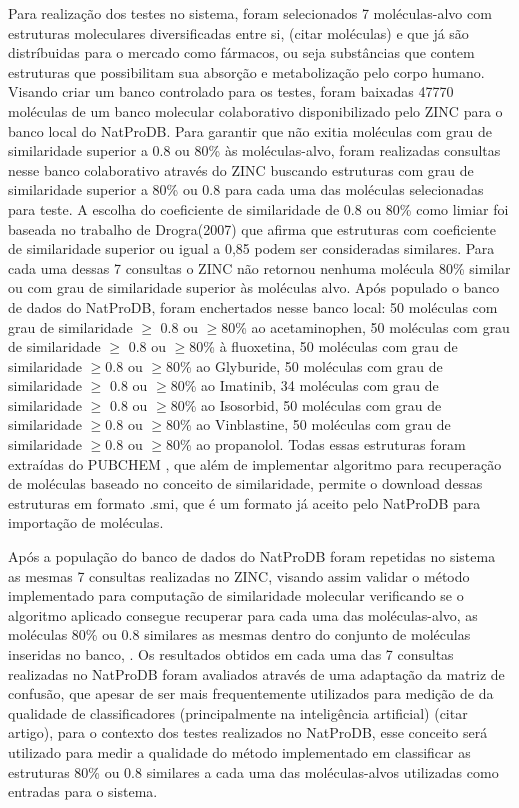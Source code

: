 Para realização dos testes no sistema, foram selecionados 7 moléculas-alvo  com estruturas moleculares diversificadas entre si, (citar moléculas) e que já são distríbuidas para o mercado como fármacos, ou seja substâncias que contem estruturas que possibilitam sua absorção e metabolização pelo corpo humano. Visando criar um banco controlado para os testes, foram baixadas 47770 moléculas de um banco molecular colaborativo disponibilizado pelo ZINC \cite{irwin2005zinc} para o banco local do NatProDB. Para garantir que não exitia moléculas com grau de similaridade superior a 0.8 ou 80\% às moléculas-alvo, foram realizadas consultas nesse banco colaborativo através do ZINC buscando estruturas com grau de similaridade superior a 80\% ou 0.8 para cada uma das moléculas selecionadas para teste. A escolha do coeficiente de similaridade de 0.8 ou 80\% como limiar foi baseada no trabalho de Drogra(2007) que afirma que estruturas com coeficiente de similaridade superior ou igual a 0,85 podem ser consideradas similares. Para cada uma dessas 7 consultas o ZINC não retornou nenhuma molécula 80\% similar ou com grau de similaridade superior às moléculas alvo. Após populado o banco de dados do NatProDB, foram enchertados nesse banco local: 50 moléculas com grau de similaridade $\geq $ 0.8 ou $\geq $80\% ao acetaminophen, 50 moléculas com grau de similaridade $\geq $ 0.8 ou $\geq $80\% à fluoxetina, 50 moléculas com grau de similaridade $\geq $0.8 ou $\geq $80\% ao Glyburide, 50 moléculas com grau de similaridade $\geq $ 0.8 ou $\geq $80\% ao Imatinib, 34 moléculas com grau de similaridade $\geq $ 0.8 ou $\geq $80\% ao Isosorbid, 50 moléculas com grau de similaridade $\geq $0.8 ou $\geq $80\% ao Vinblastine, 50 moléculas com grau de similaridade $\geq $0.8 ou $\geq $80\% ao propanolol. Todas essas estruturas foram extraídas do PUBCHEM \cite{li2010pubchem}, que além de implementar algoritmo para recuperação de moléculas baseado no conceito de similaridade, permite o download dessas estruturas em formato .smi, que é um formato já aceito pelo NatProDB para importação de moléculas.

Após a população do banco de dados do NatProDB foram repetidas no sistema as mesmas 7 consultas realizadas no ZINC, visando assim validar o método implementado para computação de similaridade molecular verificando se o algoritmo aplicado consegue recuperar para cada uma das moléculas-alvo, as moléculas 80\% ou 0.8 similares as mesmas dentro do conjunto de moléculas inseridas no banco, . Os resultados obtidos em cada uma das 7 consultas realizadas no NatProDB foram avaliados através de uma adaptação da matriz de confusão, que apesar de ser mais frequentemente utilizados para medição de da qualidade de classificadores (principalmente na inteligência artificial) (citar artigo), para o contexto dos testes realizados no NatProDB, esse conceito será utilizado para medir a qualidade do método implementado em classificar as estruturas 80\% ou 0.8 similares a cada uma das moléculas-alvos utilizadas como entradas para o sistema.    
   





   
